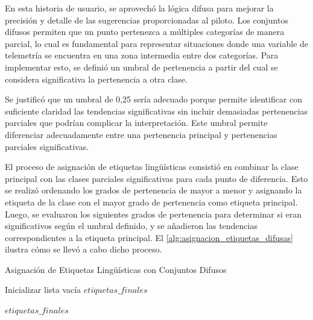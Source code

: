 En esta historia de usuario, se aprovechó la lógica difusa para mejorar la precisión y detalle de las sugerencias proporcionadas al piloto. Los conjuntos difusos permiten que un punto pertenezca a múltiples categorías de manera parcial, lo cual es fundamental para representar situaciones donde una variable de telemetría se encuentra en una zona intermedia entre dos categorías. Para implementar esto, se definió un umbral de pertenencia a partir del cual se considera significativa la pertenencia a otra clase. 

Se justificó que un umbral de 0,25 sería adecuado porque permite identificar con suficiente claridad las tendencias significativas sin incluir demasiadas pertenencias parciales que podrían complicar la interpretación. Este umbral permite diferenciar adecuadamente entre una pertenencia principal y pertenencias parciales significativas.

El proceso de asignación de etiquetas lingüísticas consistió en combinar la clase principal con las clases parciales significativas para cada punto de diferencia. Esto se realizó ordenando los grados de pertenencia de mayor a menor y asignando la etiqueta de la clase con el mayor grado de pertenencia como etiqueta principal. Luego, se evaluaron los siguientes grados de pertenencia para determinar si eran significativos según el umbral definido, y se añadieron las tendencias correspondientes a la etiqueta principal. El \autoref{alg:asignacion_etiquetas_difusas} ilustra cómo se llevó a cabo dicho proceso.

\begin{algorithm}[H]
\caption{Asignación de Etiquetas Lingüísticas con Conjuntos Difusos}
\label{alg:asignacion_etiquetas_difusas}


Inicializar lista vacía $etiquetas\_finales$\;


\Return $etiquetas\_finales$\;
\end{algorithm}

